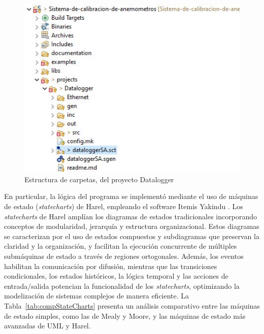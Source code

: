 \begin{figure}[H]
    \centering
    \includegraphics[width=0.40\linewidth]{Figuras/datalogger/Firmware/projectDataloggerFolder.jpg}
    \caption{Estructura de carpetas, del proyecto Datalogger}
    \label{fig:projectDataloggerFolder}
\end{figure}
En particular, la lógica del programa se implementó mediante el uso de máquinas de estado (\textit{statecharts}) de Harel, empleando el software Itemis Yakindu \cite{itemis_create}. Los \textit{statecharts} de Harel amplían los diagramas de estados tradicionales incorporando conceptos de modularidad, jerarquía y estructura organizacional. Estos diagramas se caracterizan por el uso de estados compuestos y subdiagramas que preservan la claridad y la organización, y facilitan la ejecución concurrente de múltiples submáquinas de estado a través de regiones ortogonales. Además, los eventos habilitan la comunicación por difusión, mientras que las transiciones condicionales, los estados históricos, la lógica temporal y las acciones de entrada/salida potencian la funcionalidad de los \textit{statecharts}, optimizando la modelización de sistemas complejos de manera eficiente. La Tabla~\ref{tab:compStateCharts} presenta un análisis comparativo entre las máquinas de estado simples, como las de Mealy y Moore, y las máquinas de estado más avanzadas de UML y Harel.



